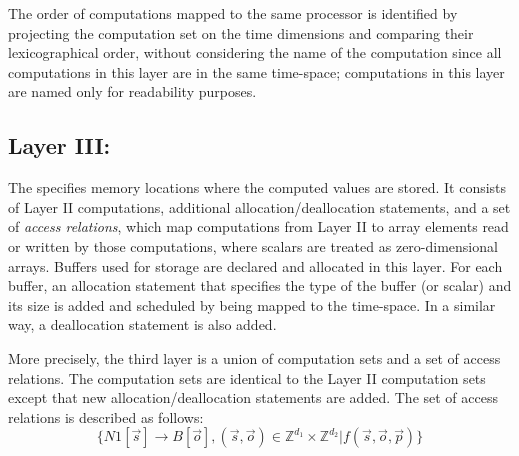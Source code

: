 

The order of computations mapped to the same processor is identified by projecting the computation set on the time dimensions and comparing their lexicographical order, without considering the name of the computation since all computations in this layer are in the same time-\processor space; computations in this layer are named only for readability purposes.



\subsection{Layer III: \Layerthree}
\label{layer3}

The \layerthree specifies memory locations where the computed values are stored.  It consists of Layer II computations, additional allocation/deallocation statements,  and a set of \emph{access relations},
which map computations from Layer II to array elements read or written by those computations, where scalars are treated as zero-dimensional arrays.  Buffers used for storage are declared and allocated in this layer. For each buffer, an allocation statement that specifies the type of the buffer (or scalar) and its size is added and scheduled by being mapped to the time-\processor space.  In a similar way, a deallocation statement is also added.

More precisely, the third layer is a union of computation sets and a set of access relations.  The computation sets are identical to the Layer II computation sets except that new allocation/deallocation statements are added.  The set of access relations is described as follows:
$$\{N1[\vec{s}] \rightarrow B[\vec{o}], (\vec{s}, \vec{o}) \in \mathbb{Z}^{d_1}\times\mathbb{Z}^{d_2} | f(\vec{s}, \vec{o}, \vec{p})\}$$

